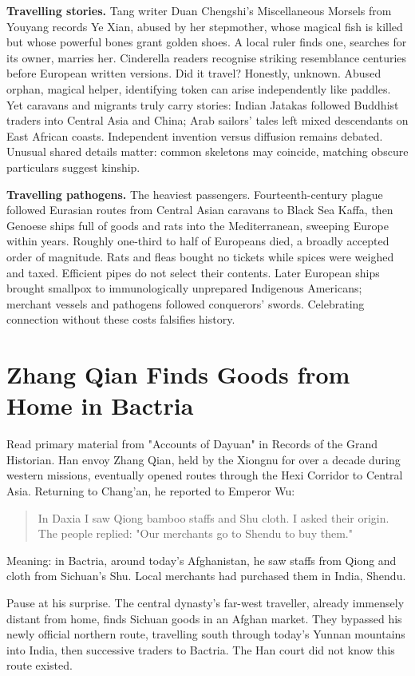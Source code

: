 \textbf{Travelling stories.} Tang writer Duan Chengshi's Miscellaneous Morsels from Youyang records Ye Xian, abused by her stepmother, whose magical fish is killed but whose powerful bones grant golden shoes. A local ruler finds one, searches for its owner, marries her. Cinderella readers recognise striking resemblance centuries before European written versions. Did it travel? Honestly, unknown. Abused orphan, magical helper, identifying token can arise independently like paddles. Yet caravans and migrants truly carry stories: Indian Jatakas followed Buddhist traders into Central Asia and China; Arab sailors' tales left mixed descendants on East African coasts. Independent invention versus diffusion remains debated. Unusual shared details matter: common skeletons may coincide, matching obscure particulars suggest kinship.

\textbf{Travelling pathogens.} The heaviest passengers. Fourteenth-century plague followed Eurasian routes from Central Asian caravans to Black Sea Kaffa, then Genoese ships full of goods and rats into the Mediterranean, sweeping Europe within years. Roughly one-third to half of Europeans died, a broadly accepted order of magnitude. Rats and fleas bought no tickets while spices were weighed and taxed. Efficient pipes do not select their contents. Later European ships brought smallpox to immunologically unprepared Indigenous Americans; merchant vessels and pathogens followed conquerors' swords. Celebrating connection without these costs falsifies history.

\section[Zhang Qian Finds Goods from Home]{Zhang Qian Finds Goods from Home in Bactria}
Read primary material from "Accounts of Dayuan" in Records of the Grand Historian. Han envoy Zhang Qian, held by the Xiongnu for over a decade during western missions, eventually opened routes through the Hexi Corridor to Central Asia. Returning to Chang'an, he reported to Emperor Wu:

\begin{quote}
In Daxia I saw Qiong bamboo staffs and Shu cloth. I asked their origin. The people replied: "Our merchants go to Shendu to buy them."
\end{quote}
Meaning: in Bactria, around today's Afghanistan, he saw staffs from Qiong and cloth from Sichuan's Shu. Local merchants had purchased them in India, Shendu.

Pause at his surprise. The central dynasty's far-west traveller, already immensely distant from home, finds Sichuan goods in an Afghan market. They bypassed his newly official northern route, travelling south through today's Yunnan mountains into India, then successive traders to Bactria. The Han court did not know this route existed.

